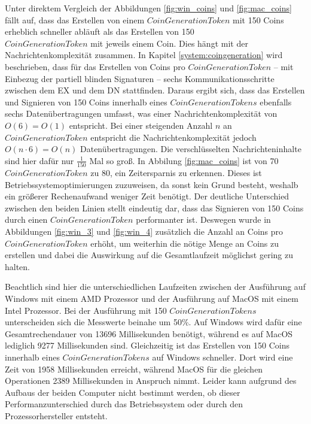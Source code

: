 \documentclass[
	fontsize=11pt,
	headings=small,
	parskip=half,           %
	bibliography=totoc,
	numbers=noenddot,       %
	open=any,               %
]{scrreprt}
\begin{document}
Unter direktem Vergleich der Abbildungen \ref{fig:win_coins} und \ref{fig:mac_coins} fällt auf, dass das Erstellen von einem $CoinGenerationToken$ mit 150 Coins erheblich schneller abläuft als das Erstellen von 150 \\$CoinGenerationToken$ mit jeweils einem Coin. Dies hängt mit der Nachrichtenkomplexität zusammen. In Kapitel \ref{system:coingeneration} wird beschrieben, dass für das Erstellen von Coins pro $CoinGenerationToken$ -- mit Einbezug der partiell blinden Signaturen -- sechs Kommunikationsschritte zwischen dem EX und dem DN stattfinden. Daraus ergibt sich, dass das Erstellen und Signieren von 150 Coins innerhalb eines $CoinGenerationTokens$ ebenfalls sechs Datenübertragungen umfasst, was einer Nachrichtenkomplexität von $O(6)=O(1)$ entspricht. Bei einer steigenden Anzahl $n$ an $CoinGenerationToken$ entspricht die Nachrichtenkomplexität jedoch $O(n\cdot6)=O(n)$ Datenübertragungen. Die verschlüsselten Nachrichteninhalte sind hier dafür nur $\frac{1}{150}$ Mal so groß. In Abbilung \ref{fig:mac_coins} ist von 70 $CoinGenerationToken$ zu 80, ein Zeitersparnis zu erkennen. Dieses ist Betriebssystemoptimierungen zuzuweisen, da sonst kein Grund besteht, weshalb ein größerer Rechenaufwand weniger Zeit benötigt. Der deutliche Unterschied zwischen den beiden Linien stellt eindeutig dar, dass das Signieren von 150 Coins durch einen $CoinGenerationToken$ performanter ist. Deswegen wurde in Abbildungen \ref{fig:win_3} und \ref{fig:win_4} zusätzlich die Anzahl an Coins pro $CoinGenerationToken$ erhöht, um weiterhin die nötige Menge an Coins zu erstellen und dabei die Auswirkung auf die Gesamtlaufzeit möglichst gering zu halten.

Beachtlich sind hier die unterschiedlichen Laufzeiten zwischen der Ausführung auf Windows mit einem AMD Prozessor und der Ausführung auf MacOS mit einem Intel Prozessor. Bei der Ausführung mit 150 $CoinGenerationTokens$ unterscheiden sich die Messwerte beinahe um 50\%. Auf Windows wird dafür eine Gesamtrechendauer von 13696 Millisekunden benötigt, während es auf MacOS lediglich 9277 Millisekunden sind. Gleichzeitig ist das Erstellen von 150 Coins innerhalb eines $CoinGenerationTokens$ auf Windows schneller. Dort wird eine Zeit von 1958 Millisekunden erreicht, während MacOS für die gleichen Operationen 2389 Millisekunden in Anspruch nimmt. Leider kann aufgrund des Aufbaus der beiden Computer nicht bestimmt werden, ob dieser Performanzunterschied durch das Betriebssystem oder durch den Prozessorhersteller entsteht.\\
\end{document}
